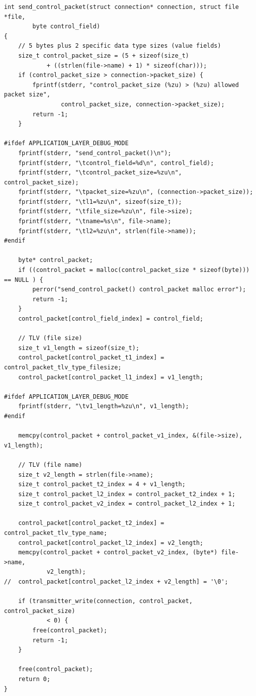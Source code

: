 \documentclass[a4paper,11pt,titlepage]{article}
\begin{document}
\begin{lstlisting}[style=customcwithlines]
int send_control_packet(struct connection* connection, struct file *file,
		byte control_field)
{
	// 5 bytes plus 2 specific data type sizes (value fields)
	size_t control_packet_size = (5 + sizeof(size_t)
			+ ((strlen(file->name) + 1) * sizeof(char)));
	if (control_packet_size > connection->packet_size) {
		fprintf(stderr, "control_packet_size (%zu) > (%zu) allowed packet size",
				control_packet_size, connection->packet_size);
		return -1;
	}

#ifdef APPLICATION_LAYER_DEBUG_MODE
	fprintf(stderr, "send_control_packet()\n");
	fprintf(stderr, "\tcontrol_field=%d\n", control_field);
	fprintf(stderr, "\tcontrol_packet_size=%zu\n", control_packet_size);
	fprintf(stderr, "\tpacket_size=%zu\n", (connection->packet_size));
	fprintf(stderr, "\tl1=%zu\n", sizeof(size_t));
	fprintf(stderr, "\tfile_size=%zu\n", file->size);
	fprintf(stderr, "\tname=%s\n", file->name);
	fprintf(stderr, "\tl2=%zu\n", strlen(file->name));
#endif

	byte* control_packet;
	if ((control_packet = malloc(control_packet_size * sizeof(byte))) == NULL ) {
		perror("send_control_packet() control_packet malloc error");
		return -1;
	}
	control_packet[control_field_index] = control_field;

	// TLV (file size)
	size_t v1_length = sizeof(size_t);
	control_packet[control_packet_t1_index] = control_packet_tlv_type_filesize;
	control_packet[control_packet_l1_index] = v1_length;

#ifdef APPLICATION_LAYER_DEBUG_MODE
	fprintf(stderr, "\tv1_length=%zu\n", v1_length);
#endif

	memcpy(control_packet + control_packet_v1_index, &(file->size), v1_length);

	// TLV (file name)
	size_t v2_length = strlen(file->name);
	size_t control_packet_t2_index = 4 + v1_length;
	size_t control_packet_l2_index = control_packet_t2_index + 1;
	size_t control_packet_v2_index = control_packet_l2_index + 1;

	control_packet[control_packet_t2_index] = control_packet_tlv_type_name;
	control_packet[control_packet_l2_index] = v2_length;
	memcpy(control_packet + control_packet_v2_index, (byte*) file->name,
			v2_length);
//	control_packet[control_packet_l2_index + v2_length] = '\0';

	if (transmitter_write(connection, control_packet, control_packet_size)
			< 0) {
		free(control_packet);
		return -1;
	}

	free(control_packet);
	return 0;
}


\end{lstlisting}
\end{document}
